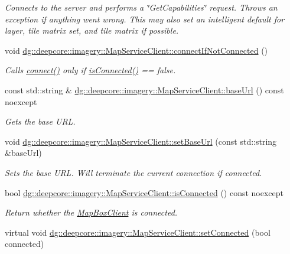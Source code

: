 \begin{DoxyCompactItemize}
\begin{DoxyCompactList}\small\item\em Connects to the server and performs a \char`\"{}\+Get\+Capabilities\char`\"{} request. Throws an exception if anything went wrong. This may also set an intelligent default for layer, tile matrix set, and tile matrix if possible. \end{DoxyCompactList}\item 
void \hyperlink{group___imagery_module_gafbcd14e6930fee4427877f52e36613ba}{dg\+::deepcore\+::imagery\+::\+Map\+Service\+Client\+::connect\+If\+Not\+Connected} ()
\begin{DoxyCompactList}\small\item\em Calls \hyperlink{group___imagery_module_ga5e5f58c725cafba7966936f688a6ade0}{connect()} only if \hyperlink{group___imagery_module_gab0c42dc6fd8965108c0bc5ef80d4d4b3}{is\+Connected()} == false. \end{DoxyCompactList}\item 
const std\+::string \& \hyperlink{group___imagery_module_gadf279770cec6dc9ac56348bb2e1b29e1}{dg\+::deepcore\+::imagery\+::\+Map\+Service\+Client\+::base\+Url} () const noexcept
\begin{DoxyCompactList}\small\item\em Gets the base U\+RL. \end{DoxyCompactList}\item 
void \hyperlink{group___imagery_module_ga39b179cd4494f868a7807f616e04ee24}{dg\+::deepcore\+::imagery\+::\+Map\+Service\+Client\+::set\+Base\+Url} (const std\+::string \&base\+Url)
\begin{DoxyCompactList}\small\item\em Sets the base U\+RL. Will terminate the current connection if connected. \end{DoxyCompactList}\item 
bool \hyperlink{group___imagery_module_gab0c42dc6fd8965108c0bc5ef80d4d4b3}{dg\+::deepcore\+::imagery\+::\+Map\+Service\+Client\+::is\+Connected} () const noexcept
\begin{DoxyCompactList}\small\item\em Return whether the \hyperlink{classdg_1_1deepcore_1_1imagery_1_1_map_box_client}{Map\+Box\+Client} is connected. \end{DoxyCompactList}\item 
virtual void \hyperlink{group___imagery_module_gadf7a167ee936ff1819c8ede7933cc6db}{dg\+::deepcore\+::imagery\+::\+Map\+Service\+Client\+::set\+Connected} (bool connected)

\end{DoxyCompactItemize}
